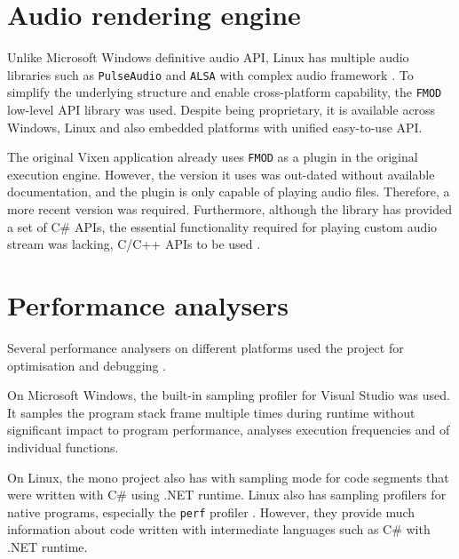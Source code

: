 \section{Audio rendering engine}

Unlike Microsoft Windows definitive audio API, Linux has multiple audio libraries such as \texttt{PulseAudio} \cite{developers2013pulseaudio} and \texttt{ALSA} \cite{alsa} with complex audio framework . To simplify the underlying structure and enable cross-platform capability, the \texttt{FMOD} \cite{fmod} low-level API library was used. Despite being proprietary, it is available across Windows, Linux and also  embedded platforms with unified easy-to-use API.

The original Vixen application already uses \texttt{FMOD} as a plugin in the original execution engine. However, the version it uses was out-dated without available documentation, and the plugin is only capable of playing audio files. Therefore, a more recent version was required. Furthermore, although the library has provided a set of C\# APIs,  the essential functionality required for playing custom audio stream was lacking, C/C++ APIs  to be used .

\section{Performance analysers}

Several performance analysers on different platforms  used  the project for optimisation and debugging .

On Microsoft Windows, the built-in sampling profiler for Visual Studio was used. It samples the program stack frame multiple times during runtime without significant impact to program performance, analyses execution frequencies and  of individual functions.

On Linux, the mono project also has  with sampling mode for  code segments that were written with C\# using .NET runtime. Linux also has sampling profilers for native programs, especially the \texttt{perf} profiler \cite{de2010new}. However, they  provide much information about code written with intermediate languages such as C\# with .NET runtime. 

